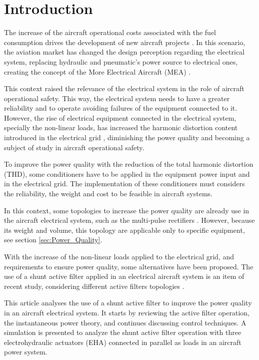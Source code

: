 \section{Introduction}

The increase of the aircraft operational costs associated with the fuel consumption drives the development of new aircraft projects \citep{Babikian2002}. In this scenario, the aviation market has changed the design perception regarding the electrical system, replacing hydraulic and pneumatic’s power source to electrical ones, creating the concept of the More Electrical Aircraft (MEA) \citep{Moir1999}.

This context raised the relevance of the electrical system in the role of aircraft operational safety. This way, the electrical system needs to have a greater reliability and to operate avoiding failures of the equipment connected to it. However, the rise of electrical equipment connected in the electrical system, specially the non-linear loads, has increased the harmonic distortion content introduced in the electrical grid \citep{Singer2012}, diminishing the power quality and becoming a subject of study in aircraft operational safety. 

To improve the power quality with the reduction of the total harmonic distortion (THD), some conditioners have to be applied in the equipment power input and in the electrical grid. The implementation of these conditioners must considers the reliability, the weight and cost to be feasible in aircraft systems.

In this context, some topologies to increase the power quality are already use in the aircraft electrical system, such as the multi-pulse rectifiers \citep{Zhu2014,Gong2003,Lobo2005}. However, because its weight and volume, this topology are applicable only to specific equipment, see section \ref{sec:Power_Quality}.

With the increase of the non-linear loads applied to the electrical grid, and requirements to ensure power quality, some alternatives have been proposed. The use of a shunt active filter applied in an electrical aircraft system is an item of recent study, considering different active filters topologies \citep{Chen2012research,Chen2012novel,Chen2012control}.

This article analyses the use of a shunt active filter to improve the power quality in an aircraft electrical system. It starts by reviewing the active filter operation, the instantaneous power theory, and continues discussing control techniques. A simulation is presented to analyze the shunt active filter operation with three electrohydraulic actuators (EHA) connected in parallel as loads in an aircraft power system.


